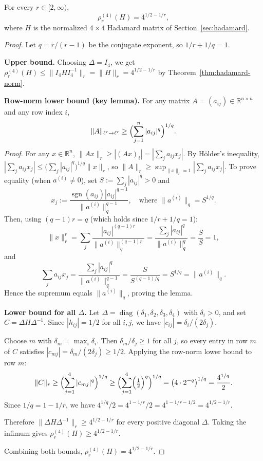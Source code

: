 \begin{theorem}\label{thm:rho-hadamard}
For every $r\in[2,\infty)$,
\[
\rho_r^{(4)}(H) = 4^{1/2-1/r},
\]
where $H$ is the normalized $4\times4$ Hadamard matrix of Section~\ref{sec:hadamard}.
\end{theorem}

\begin{proof}
Let $q=r/(r-1)$ be the conjugate exponent, so $1/r+1/q=1$.

\textbf{Upper bound.} Choosing $\Delta=I_4$, we get $\rho_r^{(4)}(H)\le\|I_4HI_4^{-1}\|_r=\|H\|_r=4^{1/2-1/r}$ by Theorem~\ref{thm:hadamard-norm}.

\textbf{Row-norm lower bound (key lemma).}
For any matrix $A=(a_{ij})\in\mathbb{R}^{n\times n}$ and any row index $i$,
\[
\|A\|_{\ell^r\to\ell^r}\ge\Bigl(\sum_{j=1}^n|a_{ij}|^q\Bigr)^{1/q}.
\]
\emph{Proof.} For any $x\in\mathbb{R}^n$, $\|Ax\|_r\ge|(Ax)_i|=|\sum_j a_{ij}x_j|$. By H\"{o}lder's inequality,
$|\sum_j a_{ij}x_j|\le\bigl(\sum_j|a_{ij}|^q\bigr)^{1/q}\|x\|_r$,
so $\|A\|_r\ge\sup_{\|x\|_r=1}|\sum_j a_{ij}x_j|$.
To prove equality (when $a^{(i)}\ne0$), set $S:=\sum_j|a_{ij}|^q>0$ and
\[
x_j:=\frac{\operatorname{sgn}(a_{ij})|a_{ij}|^{q-1}}{\|a^{(i)}\|_q^{q-1}},
\quad\text{where }\|a^{(i)}\|_q=S^{1/q}.
\]
Then, using $(q-1)r=q$ (which holds since $1/r+1/q=1$):
\[
\|x\|_r^r=\sum_j\frac{|a_{ij}|^{(q-1)r}}{\|a^{(i)}\|_q^{(q-1)r}}
=\frac{\sum_j|a_{ij}|^q}{\|a^{(i)}\|_q^q}=\frac{S}{S}=1,
\]
and
\[
\sum_j a_{ij}x_j=\frac{\sum_j|a_{ij}|^q}{\|a^{(i)}\|_q^{q-1}}=\frac{S}{S^{(q-1)/q}}=S^{1/q}=\|a^{(i)}\|_q.
\]
Hence the supremum equals $\|a^{(i)}\|_q$, proving the lemma.

\textbf{Lower bound for all $\Delta$.}
Let $\Delta=\operatorname{diag}(\delta_1,\delta_2,\delta_3,\delta_4)$ with $\delta_i>0$, and set $C=\Delta H\Delta^{-1}$. Since $|h_{ij}|=1/2$ for all $i,j$, we have $|c_{ij}|=\delta_i/(2\delta_j)$.

Choose $m$ with $\delta_m=\max_i\delta_i$. Then $\delta_m/\delta_j\ge1$ for all $j$, so every entry in row $m$ of $C$ satisfies $|c_{mj}|=\delta_m/(2\delta_j)\ge 1/2$. Applying the row-norm lower bound to row $m$:
\[
\|C\|_r
\ge
\Bigl(\sum_{j=1}^4|c_{mj}|^q\Bigr)^{1/q}
\ge
\Bigl(\sum_{j=1}^4\Bigl(\tfrac{1}{2}\Bigr)^q\Bigr)^{1/q}
=
\bigl(4\cdot 2^{-q}\bigr)^{1/q}
=
\frac{4^{1/q}}{2}.
\]
Since $1/q=1-1/r$, we have $4^{1/q}/2=4^{1-1/r}/2=4^{1-1/r-1/2}=4^{1/2-1/r}$.

Therefore $\|\Delta H\Delta^{-1}\|_r\ge4^{1/2-1/r}$ for every positive diagonal $\Delta$.
Taking the infimum gives $\rho_r^{(4)}(H)\ge4^{1/2-1/r}$.

Combining both bounds, $\rho_r^{(4)}(H)=4^{1/2-1/r}$.
\end{proof}

